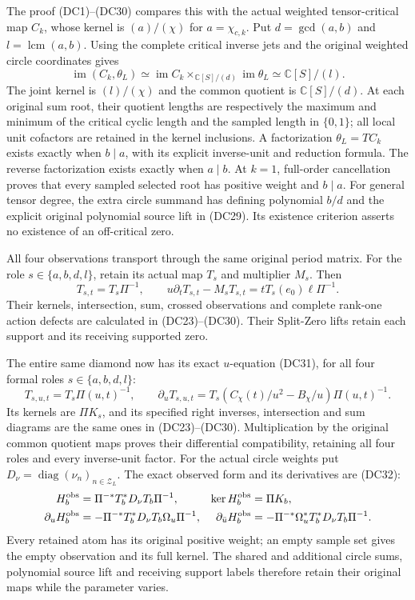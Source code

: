 The proof (DC1)--(DC30) compares this with the actual weighted
tensor-critical map $C_k$, whose kernel is $(a)/(\chi)$ for
$a=\chi_{c,k}$. Put $d=\gcd(a,b)$ and $l=\operatorname{lcm}(a,b)$.
Using the complete critical inverse jets and the original weighted
circle coordinates gives
\[
 \operatorname{im}(C_k,\theta_L)
   \simeq\operatorname{im}C_k
        \mathop{\times}_{\mathbb C[S]/(d)}\operatorname{im}\theta_L
   \simeq\mathbb C[S]/(l).
\]
The joint kernel is $(l)/(\chi)$ and the common quotient is
$\mathbb C[S]/(d)$. At each original sum root, their quotient
lengths are respectively the maximum and minimum of the critical
cyclic length and the sampled length in $\{0,1\}$; all local unit
cofactors are retained in the kernel inclusions. A factorization
$\theta_L=T C_k$ exists exactly when $b\mid a$, with its explicit
inverse-unit and reduction formula. The reverse factorization exists
exactly when $a\mid b$. At $k=1$, full-order cancellation proves
that every sampled selected root has positive weight and $b\mid a$.
For general tensor degree, the extra circle summand has defining
polynomial $b/d$ and the explicit original polynomial source lift
in (DC29). Its existence criterion asserts no existence of an
off-critical zero.

All four observations transport through the same original period
matrix. For the role $s\in\{a,b,d,l\}$, retain its actual map $T_s$
and multiplier $M_s$. Then
\[
 T_{s,t}=T_s\Pi^{-1},\qquad
 u\partial_tT_{s,t}-M_sT_{s,t}
       =tT_s(e_0)\ell\Pi^{-1}.
\]
Their kernels, intersection, sum, crossed observations and complete
rank-one action defects are calculated in (DC23)--(DC30). Their
Split-Zero lifts retain each support and its receiving supported zero.

The entire same diamond now has its exact \(u\)-equation
(DC31), for all four formal roles \(s\in\{a,b,d,l\}\):
\[
 T_{s,u,t}=T_s\Pi(u,t)^{-1},\qquad
 \partial_uT_{s,u,t}
   =T_s(C_\chi(t)/u^2-B_\chi/u)\Pi(u,t)^{-1}.
\]
Its kernels are \(\Pi K_s\), and its specified right
inverses, intersection and sum diagrams are the same ones
in (DC23)--(DC30).  Multiplication by the original common
quotient maps proves their differential compatibility,
retaining all four roles and every inverse-unit factor.
For the actual circle weights put
\(D_\nu=\operatorname{diag}(\nu_n)_{n\in\mathcal Z_L}\).
The exact observed form and its derivatives are (DC32):
\[
 \begin{aligned}
 H_b^{\rm obs}&=\Pi^{-*}T_b^*D_\nu T_b\Pi^{-1},
 &\ker H_b^{\rm obs}&=\Pi K_b,\\
 \partial_uH_b^{\rm obs}
   &=-\Pi^{-*}T_b^*D_\nu T_b\Omega_u\Pi^{-1},&
 \partial_{\bar u}H_b^{\rm obs}
   &=-\Pi^{-*}\Omega_u^*T_b^*D_\nu T_b\Pi^{-1}.
 \end{aligned}
\]
Every retained atom has its original positive weight; an
empty sample set gives the empty observation and its full
kernel.  The shared and additional circle sums, polynomial
source lift and receiving support labels therefore retain
their original maps while the parameter varies.


